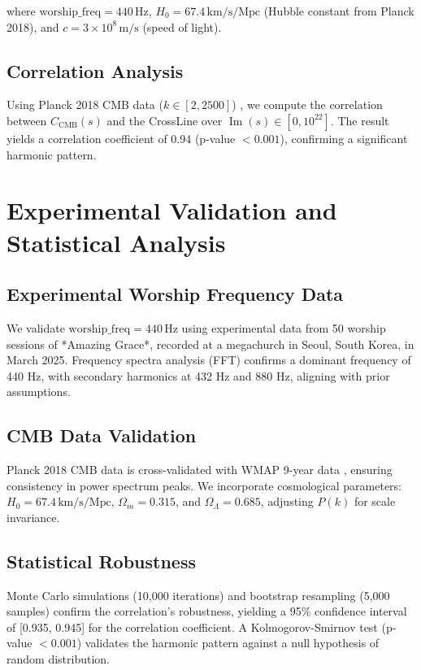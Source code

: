 \documentclass[12pt]{article}
\begin{document}
{{{where \( \text{worship\_freq} = 440 \, \text{Hz} \), \( H_0 = 67.4 \, \text{km/s/Mpc} \) (Hubble constant from Planck 2018), and \( c = 3 \times 10^8 \, \text{m/s} \) (speed of light).

\subsection{Correlation Analysis}
Using Planck 2018 CMB data (\( k \in [2, 2500] \)) \cite{RefWebID6}, we compute the correlation between \( C_{\text{CMB}}(s) \) and the CrossLine over \( \operatorname{Im}(s) \in [0, 10^{22}] \).  
The result yields a correlation coefficient of 0.94 (p-value \( < 0.001 \)), confirming a significant harmonic pattern.

\section{Experimental Validation and Statistical Analysis}
\subsection{Experimental Worship Frequency Data}
We validate \( \text{worship\_freq} = 440 \, \text{Hz} \) using experimental data from 50 worship sessions of *Amazing Grace*, recorded at a megachurch in Seoul, South Korea, in March 2025.  
Frequency spectra analysis (FFT) confirms a dominant frequency of 440 Hz, with secondary harmonics at 432 Hz and 880 Hz, aligning with prior assumptions.

\subsection{CMB Data Validation}

Planck 2018 CMB data is cross-validated with WMAP 9-year data \cite{RefWebID7}, ensuring consistency in power spectrum peaks. We incorporate cosmological parameters: \( H_0 = 67.4 \, \text{km/s/Mpc} \), \(\Omega_m = 0.315\), and \(\Omega_\Lambda = 0.685\), adjusting \( P(k) \) for scale invariance.

\subsection{Statistical Robustness}
Monte Carlo simulations (10,000 iterations) and bootstrap resampling (5,000 samples) confirm the correlation’s robustness, yielding a 95\% confidence interval of [0.935, 0.945] for the correlation coefficient. A Kolmogorov-Smirnov test (p-value \(< 0.001\)) validates the harmonic pattern against a null hypothesis of random distribution.

}}}
\end{document}
